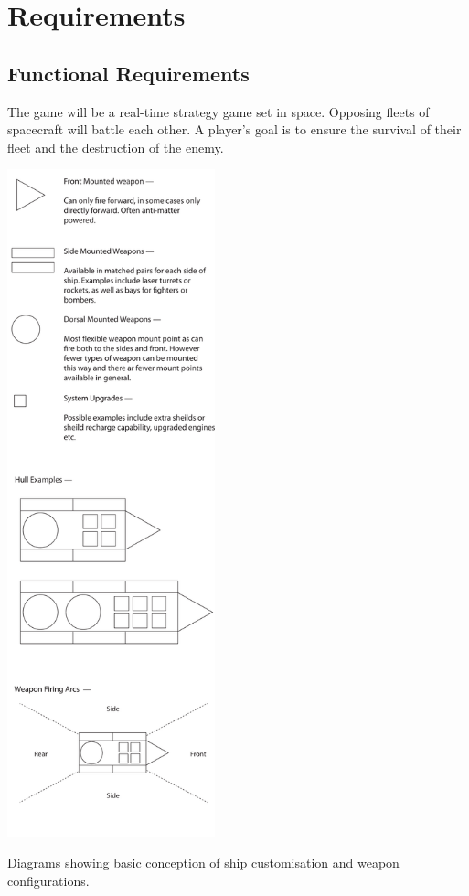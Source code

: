 \section[Requirements]{Requirements}
\label{section:requirements}



\subsection{Functional Requirements}


The game will be a real-time strategy game set in space. Opposing fleets of spacecraft
will battle each other. A player's goal is to ensure the survival of their fleet and the destruction
of the enemy.

\begin{marginfigure}
	\includegraphics[width=6cm]{res/ship_design}
	\caption{Diagrams showing basic conception of ship customisation and weapon configurations. }
	\label{fig:ship_design}
\end{marginfigure}

